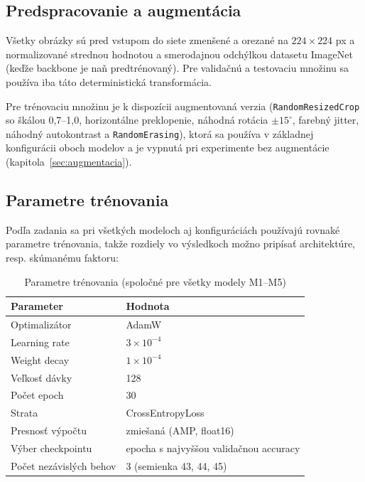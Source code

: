 \subsection{Predspracovanie a augmentácia}

Všetky obrázky sú pred vstupom do siete zmenšené a orezané na $224\times224$
px a normalizované strednou hodnotou a smerodajnou odchýlkou datasetu
ImageNet (keďže backbone je naň predtrénovaný). Pre validačnú a testovaciu
množinu sa používa iba táto deterministická transformácia.

Pre trénovaciu množinu je k dispozícii augmentovaná verzia
(\texttt{RandomResizedCrop} so škálou 0,7--1,0, horizontálne preklopenie,
náhodná rotácia $\pm15^\circ$, farebný jitter, náhodný autokontrast
a \texttt{RandomErasing}), ktorá sa používa v základnej konfigurácii oboch
modelov a je vypnutá pri experimente bez augmentácie
(kapitola~\ref{sec:augmentacia}).

\subsection{Parametre trénovania}
\label{sec:params}

Podľa zadania sa pri všetkých modeloch aj konfiguráciách používajú rovnaké
parametre trénovania, takže rozdiely vo výsledkoch možno pripísať
architektúre, resp. skúmanému faktoru:

\begin{table}[H]
    \centering
    \caption{Parametre trénovania (spoločné pre všetky modely M1--M5)}
    \label{tab:params}
    \begin{tabular}{ll}
        \toprule
        Parameter & Hodnota \\
        \midrule
        Optimalizátor & AdamW \\
        Learning rate & $3 \times 10^{-4}$ \\
        Weight decay & $1 \times 10^{-4}$ \\
        Veľkosť dávky & 128 \\
        Počet epoch & 30 \\
        Strata & CrossEntropyLoss \\
        Presnosť výpočtu & zmiešaná (AMP, float16) \\
        Výber checkpointu & epocha s najvyššou validačnou accuracy \\
        Počet nezávislých behov & 3 (semienka 43, 44, 45) \\
        \bottomrule
    \end{tabular}
\end{table}

